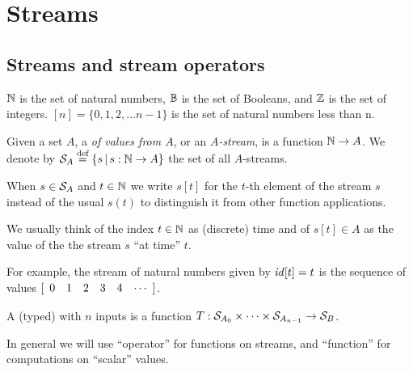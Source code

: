 \section{Streams}\label{sec:streams}

\subsection{Streams and stream operators}\label{sec:notation}

$\mathbb{N}$ is the set of natural numbers, $\mathbb{B}$ is the set of Booleans, and $\mathbb{Z}$ is the set of integers.
$[n] = \{ 0, 1, 2, \ldots n-1 \}$ is the set of natural numbers less than n.

\begin{definition}[stream]
Given a set $A$, a  \emph{of values from $A$}, or an \emph{$A$-stream}, is a function $\mathbb{N} \rightarrow A$.
We denote by $\mathcal{S}_{A} \stackrel{\textrm{\scriptsize def}}{=} \{ s \,|\, s : \mathbb{N} \to A \}$ the set of all $A$-streams.
\end{definition}

When $s\in\mathcal{S}_{A}$ and $t\in\mathbb{N}$ we
write $s[t]$ for the $t$-th element of the stream $s$ instead of the usual $s(t)$
to distinguish it from other function applications.

We usually think of the index $t\in\mathbb{N}$ as (discrete) time and of $s[t]\in A$
as the value of the the stream $s$ ``at time'' $t$.

For example, the stream of natural numbers given by $\mathit{id}[t] = t$ is the sequence of values
$\sv{0 1 2 3 4}$.

\begin{comment}
\begin{definition}
A \defined{finite stream} with $n$ values from $A$ is a function $[n] \to A$.
\end{definition}

A prefix of a stream is a finite stream.  For example, the prefix of $\id$ containing
the first 5 values is the finite stream
$[\begin{array}{ccccc} 0 & 1 & 2 & 3 & 4 \end{array}]$.
\end{comment}

\begin{definition}
A (typed)  with $n$ inputs is a function $T:\mathcal{S}_{A_0}\times\cdots\times\mathcal{S}_{A_{n-1}}\to\mathcal{S}_{B}$.
\end{definition}

In general we will use ``operator'' for functions on streams, and
``function'' for computations on ``scalar'' values.

